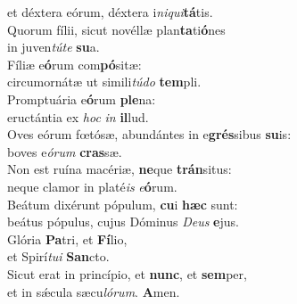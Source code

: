\evenverse et déxtera eórum, déxtera i\textit{ni}\textit{qui}\textbf{tá}tis.\\
\oddverse Quorum fílii, sicut novéllæ plan\textbf{ta}ti\textbf{ó}nes~\*\\
\oddverse in juven\textit{tú}\textit{te} \textbf{su}a.\\
\evenverse Fíliæ e\textbf{ó}rum com\textbf{pó}sitæ:~\*\\
\evenverse circumornátæ ut simili\textit{tú}\textit{do} \textbf{tem}pli.\\
\oddverse Promptuária e\textbf{ó}rum \textbf{ple}na:~\*\\
\oddverse eructántia ex \textit{hoc} \textit{in} \textbf{il}lud.\\
\evenverse Oves eórum fœtósæ, abundántes in e\textbf{grés}sibus \textbf{su}is:~\*\\
\evenverse boves e\textit{ó}\textit{rum} \textbf{cras}sæ.\\
\oddverse Non est ruína macériæ, \textbf{ne}que \textbf{trán}situs:~\*\\
\oddverse neque clamor in platé\textit{is} \textit{e}\textbf{ó}rum.\\
\evenverse Beátum dixérunt pópulum, \textbf{cu}i \textbf{hæc} sunt:~\*\\
\evenverse beátus pópulus, cujus Dóminus \textit{De}\textit{us} \textbf{e}jus.\\
\oddverse Glória \textbf{Pa}tri, et \textbf{Fí}lio,~\*\\
\oddverse et Spirí\textit{tu}\textit{i} \textbf{San}cto.\\
\evenverse Sicut erat in princípio, et \textbf{nunc}, et \textbf{sem}per,~\*\\
\evenverse et in sǽcula sæcu\textit{ló}\textit{rum}. \textbf{A}men.\\
